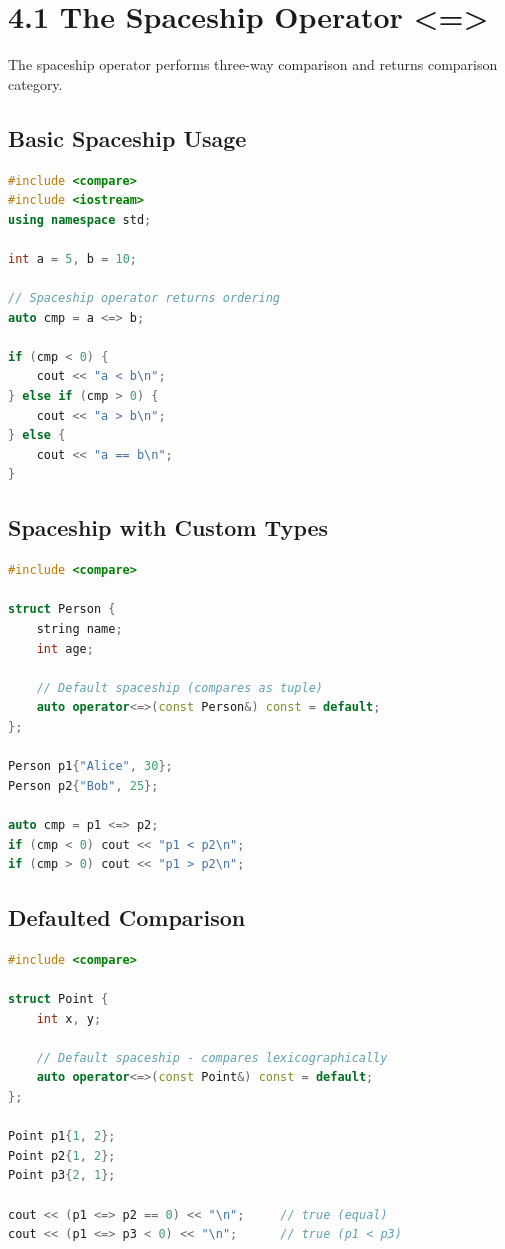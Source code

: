 \hypertarget{the-spaceship-operator}{%
\section{4.1 The Spaceship Operator
\textless=\textgreater{}}\label{the-spaceship-operator}}

The spaceship operator performs three-way comparison and returns
comparison category.

\hypertarget{basic-spaceship-usage}{%
\subsection{Basic Spaceship Usage}\label{basic-spaceship-usage}}

\begin{lstlisting}[language={C++}]
#include <compare>
#include <iostream>
using namespace std;

int a = 5, b = 10;

// Spaceship operator returns ordering
auto cmp = a <=> b;

if (cmp < 0) {
    cout << "a < b\n";
} else if (cmp > 0) {
    cout << "a > b\n";
} else {
    cout << "a == b\n";
}
\end{lstlisting}

\hypertarget{spaceship-with-custom-types}{%
\subsection{Spaceship with Custom
Types}\label{spaceship-with-custom-types}}

\begin{lstlisting}[language={C++}]
#include <compare>

struct Person {
    string name;
    int age;
    
    // Default spaceship (compares as tuple)
    auto operator<=>(const Person&) const = default;
};

Person p1{"Alice", 30};
Person p2{"Bob", 25};

auto cmp = p1 <=> p2;
if (cmp < 0) cout << "p1 < p2\n";
if (cmp > 0) cout << "p1 > p2\n";
\end{lstlisting}

\hypertarget{defaulted-comparison}{%
\subsection{Defaulted Comparison}\label{defaulted-comparison}}

\begin{lstlisting}[language={C++}]
#include <compare>

struct Point {
    int x, y;
    
    // Default spaceship - compares lexicographically
    auto operator<=>(const Point&) const = default;
};

Point p1{1, 2};
Point p2{1, 2};
Point p3{2, 1};

cout << (p1 <=> p2 == 0) << "\n";     // true (equal)
cout << (p1 <=> p3 < 0) << "\n";      // true (p1 < p3)
\end{lstlisting}


